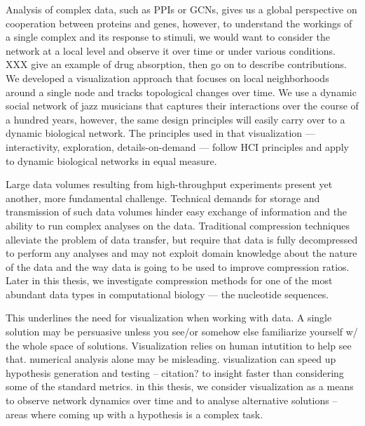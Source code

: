 
Analysis of complex data, such as PPIs or GCNs, gives us a global perspective on cooperation between proteins and genes, however, to understand the workings of a single complex and its response to stimuli, we would want to consider the network at a local level and observe it over time or under various conditions. XXX give an example of drug absorption, then go on to describe contributions. 
We developed a visualization approach that focuses on local neighborhoods around a single node and tracks topological changes over time. We use a dynamic social network of jazz musicians that captures their interactions over the course of a hundred years, however, the same design principles will easily carry over to a dynamic biological network. The principles used in that visualization --- interactivity, exploration, details-on-demand --- follow HCI principles and apply to dynamic biological networks in equal measure.


Large data volumes resulting from high-throughput experiments present yet another, more fundamental challenge. Technical demands for storage and transmission of such data volumes hinder easy exchange of information and the ability to run complex analyses on the data. Traditional compression techniques alleviate the problem of data transfer, but require that data is fully decompressed to perform any analyses and may not exploit domain knowledge about the nature of the data and the way data is going to be used to improve compression ratios. Later in this thesis, we investigate compression methods for one of the most abundant data types in computational biology --- the nucleotide sequences.


This underlines the need for visualization when working with data. A single solution may be persuasive unless you see/or somehow else familiarize yourself w/ the whole space of solutions. Visualization relies on human intutition to help see that. numerical analysis alone may be misleading. visualization can speed up hypothesis generation and testing -- citation? to insight faster than considering some of the standard metrics. in this thesis, we consider visualization as a means to observe network dynamics over time and to analyse alternative solutions -- areas where coming up with a hypothesis is a complex task.

